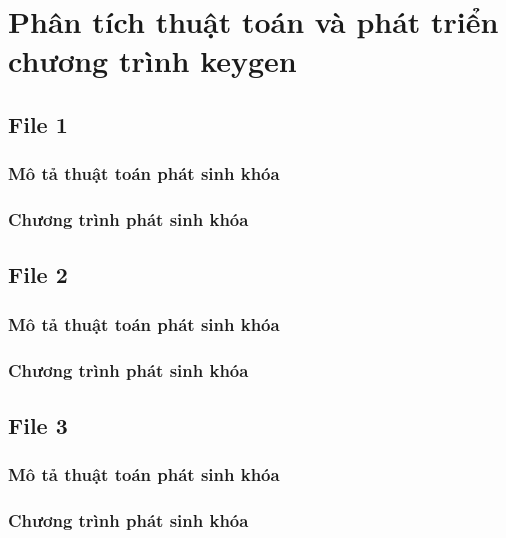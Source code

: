 \section{Phân tích thuật toán và phát triển chương trình keygen}

\subsection{File 1}
\subsubsection{Mô tả thuật toán phát sinh khóa}

\subsubsection{Chương trình phát sinh khóa}

\subsection{File 2}
\subsubsection{Mô tả thuật toán phát sinh khóa}

\subsubsection{Chương trình phát sinh khóa}

\subsection{File 3}
\subsubsection{Mô tả thuật toán phát sinh khóa}

\subsubsection{Chương trình phát sinh khóa}